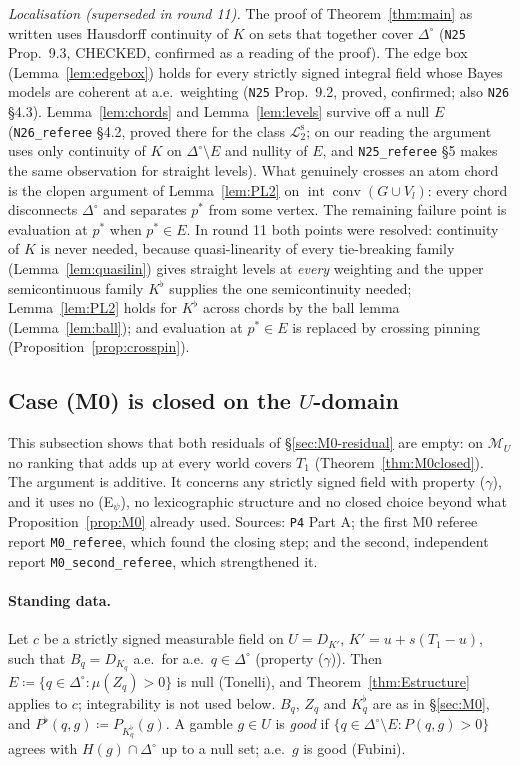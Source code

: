 \documentclass[11pt]{article}
\theoremstyle{definition}
\theoremstyle{remark}
\newcommand{\Di}{\Delta^{\circ}}
\newcommand{\M}{\mathcal M}
\newcommand{\co}{\operatorname{conv}}
\newcommand{\src}[1]{\texttt{#1}}
\newcommand{\Ltwo}{\mathcal L_2^{\mathrm s}}
\begin{document}
\emph{Localisation (superseded in round 11).} The proof of Theorem~\ref{thm:main} as written uses Hausdorff continuity of $K$ on sets that together cover $\Di$ (\src{N25} Prop.~9.3, CHECKED, confirmed as a reading of the proof). The edge box (Lemma~\ref{lem:edgebox}) holds for every strictly signed integral field whose Bayes models are coherent at a.e.\ weighting (\src{N25} Prop.~9.2, proved, confirmed; also \src{N26} \S4.3). Lemma~\ref{lem:chords} and Lemma~\ref{lem:levels} survive off a null $E$ (\src{N26\_referee} \S4.2, proved there for the class $\Ltwo$; on our reading the argument uses only continuity of $K$ on $\Di\setminus E$ and nullity of $E$, and \src{N25\_referee} \S5 makes the same observation for straight levels). What genuinely crosses an atom chord is the clopen argument of Lemma~\ref{lem:PL2} on $\operatorname{int}\co(G\cup V_l)$: every chord disconnects $\Di$ and separates $p^*$ from some vertex. The remaining failure point is evaluation at $p^*$ when $p^*\in E$. In round 11 both points were resolved: continuity of $K$ is never needed, because quasi-linearity of every tie-breaking family (Lemma~\ref{lem:quasilin}) gives straight levels at \emph{every} weighting and the upper semicontinuous family $K^\flat$ supplies the one semicontinuity needed; Lemma~\ref{lem:PL2} holds for $K^\flat$ across chords by the ball lemma (Lemma~\ref{lem:ball}); and evaluation at $p^*\in E$ is replaced by crossing pinning (Proposition~\ref{prop:crosspin}).

\subsection{Case (M0) is closed on the \texorpdfstring{$U$}{U}-domain}\label{sec:M0-closed}

This subsection shows that both residuals of \S\ref{sec:M0-residual} are empty: on $\M_U$ no ranking that adds up at every world covers $T_1$ (Theorem~\ref{thm:M0closed}). The argument is additive. It concerns any strictly signed field with property ($\gamma$), and it uses no (E$_\psi$), no lexicographic structure and no closed choice beyond what Proposition~\ref{prop:M0} already used. Sources: \src{P4} Part A; the first M0 referee report \src{M0\_referee}, which found the closing step; and the second, independent report \src{M0\_second\_referee}, which strengthened it.

\paragraph{Standing data.} Let $c$ be a strictly signed measurable field on $U=D_{K'}$, $K'=u+s(T_1-u)$, such that $B_q=D_{K_q}$ a.e.\ for a.e.\ $q\in\Di$ (property ($\gamma$)). Then $E\coloneqq\{q\in\Di:\mu(Z_q)>0\}$ is null (Tonelli), and Theorem~\ref{thm:Estructure} applies to $c$; integrability is not used below. $B_q$, $Z_q$ and $K^\flat_q$ are as in \S\ref{sec:M0}, and $P^\flat(q,g)\coloneqq P_{K^\flat_q}(g)$. A gamble $g\in U$ is \emph{good} if $\{q\in\Di\setminus E:P(q,g)>0\}$ agrees with $H(g)\cap\Di$ up to a null set; a.e.\ $g$ is good (Fubini).
\end{document}
